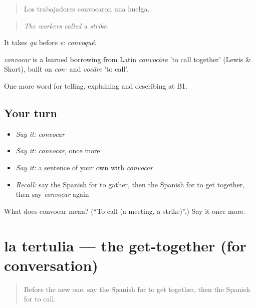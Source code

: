 \begin{quote}
Los trabajadores convocaron una huelga.
\end{quote}

\begin{quote}
\emph{The workers called a strike.}
\end{quote}

It takes \emph{qu} before \emph{e}: \emph{convoqué}.

\begin{cousinweb}
\emph{convocar} is a learned borrowing from Latin \emph{convocāre} 'to call together' (Lewis \& Short), built on \emph{con-} and \emph{vocāre} 'to call'.
\end{cousinweb}

\begin{grammarlens}[title={What you've built}]
One more word for telling, explaining and describing at B1.
\end{grammarlens}

\subsection*{Your turn}
\begin{itemize}
\raggedright
  \item \emph{Say it:} \emph{convocar}
  \item \emph{Say it:} \emph{convocar}, once more
  \item \emph{Say it:} a sentence of your own with \emph{convocar}
  \item \emph{Recall:} say the Spanish for to gather, then the Spanish for to get together, then say \emph{convocar} again
\end{itemize}

\begin{tcolorbox}[breakable,colback=teal!4,colframe=teal!35!black,title={Before you move on}]
What does convocar mean? (\textquotedblleft{}To call (a meeting, a strike)\textquotedblright{}.) Say it once more.
\end{tcolorbox}
\section[la tertulia]{la tertulia — the get-together (for conversation)}

\label{lesson:ES-C560-tertulia}



\begin{quote}
Before the new one: say the Spanish for to get together, then the Spanish for to call.
\end{quote}

